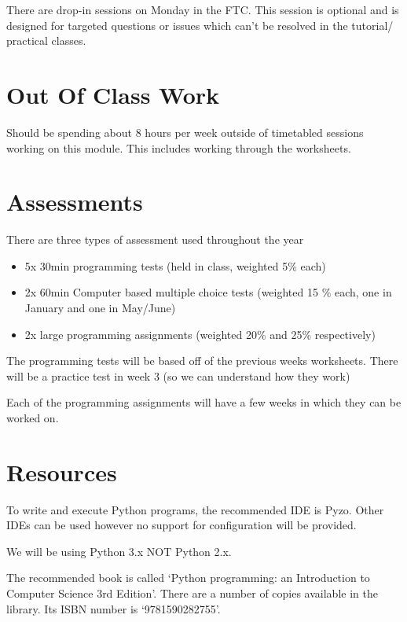 There are drop-in sessions on Monday in the FTC. This session is optional and is designed for targeted questions or issues which can't be resolved in the tutorial/ practical classes. 

\section*{Out Of Class Work}
Should be spending about 8 hours per week outside of timetabled sessions working on this module. This includes working through the worksheets. 

\section*{Assessments}
There are three types of assessment used throughout the year
\begin{itemize}
    \item 5x 30min programming tests (held in class, weighted 5\% each)
    \item 2x 60min Computer based multiple choice tests (weighted 15 \% each, one in January and one in May/June)
    \item 2x large programming assignments (weighted 20\% and 25\% respectively)
\end{itemize}
The programming tests will be based off of the previous weeks worksheets. There will be a practice test in week 3 (so we can understand how they work)

Each of the programming assignments will have a few weeks in which they can be worked on.

\section*{Resources}
To write and execute Python programs, the recommended IDE is Pyzo. Other IDEs can be used however no support for configuration will be provided.

We will be using Python 3.x NOT Python 2.x.

The recommended book is called `Python programming: an Introduction to Computer Science 3rd Edition'. There are a number of copies available in the library. Its ISBN number is `9781590282755'.
